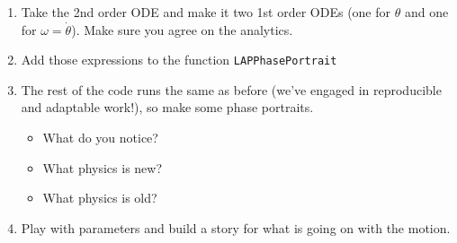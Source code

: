 \begin{enumerate}
\def\labelenumi{\arabic{enumi}.}
\tightlist
\item
  Take the 2nd order ODE and make it two 1st order ODEs (one for
  \(\theta\) and one for \(\omega=\dot{\theta}\)). Make sure you agree
  on the analytics.
\item
  Add those expressions to the function \texttt{LAPPhasePortrait}
\item
  The rest of the code runs the same as before (we've engaged in
  reproducible and adaptable work!), so make some phase portraits.

  \begin{itemize}
  \tightlist
  \item
    What do you notice?
  \item
    What physics is new?
  \item
    What physics is old?
  \end{itemize}
\item
  Play with parameters and build a story for what is going on with the
  motion.
\end{enumerate}

